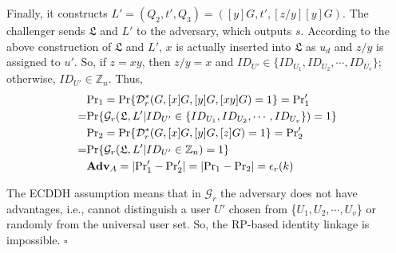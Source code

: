 {{{{%
%
Finally, it constructs $L' = (Q_2, t', Q_3) = ([y]G, t', [z/y][y]G)$. The challenger sends $\mathfrak{L}$ and $L'$ to the adversary, which outputs $s$. According to the above construction of $\mathfrak{L}$ and $L'$,
    $x$ is actually inserted into $\mathfrak{L}$ as $u_d$
    and $z/y$ is assigned to $u'$.
So, if $z = xy$, then $z/y=x$ and $ID_{U'} \in \{ID_{U_1}, ID_{U_2}, \cdots, ID_{U_v}\}$;
    otherwise, $ID_{U'} \in \mathbb{Z}_n$.
Thus,
\begin{align*}
&{\rm Pr}_1={\rm Pr}\{\mathcal{D}^*_r(G, [x]G, [y]G, [xy]G)=1\}={\rm Pr}'_1 \\=&  {\rm Pr}\{\mathcal{G}_r(\mathfrak{L}, L'|ID_{U'} \in \{ID_{U_1}, ID_{U_2}, \cdots, ID_{U_v}\})=1\} \\
&{\rm Pr}_2={\rm Pr}\{\mathcal{D}^*_r(G, [x]G, [y]G, [z]G)=1\} ={\rm Pr}'_2 \\=&  {\rm Pr}\{\mathcal{G}_r(\mathfrak{L}, L'|ID_{U'} \in \mathbb{Z}_n)=1\}\\
&{\mathbf{Adv}}_{A}=|{\rm Pr}'_1-{\rm Pr}'_2|=|{\rm Pr}_1-{\rm Pr}_2|=\epsilon_{r}(k)
\end{align*}

The ECDDH assumption means that in $\mathcal{G}_r$ the adversary does not have advantages, i.e., cannot distinguish a user $U'$ chosen from \{${U_1}, {U_2}, \cdots, {U_v}$\} or randomly from the universal user set.
So, the RP-based identity linkage is impossible. \hfill $\square$

}}}}
